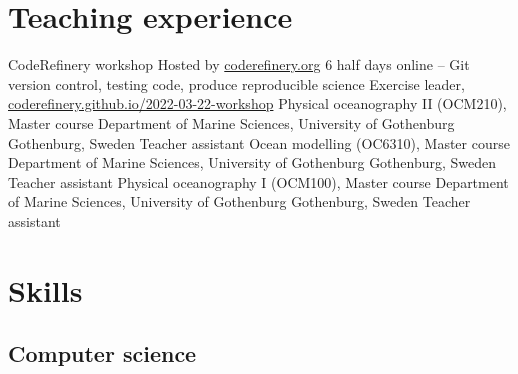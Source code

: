 \documentclass[11pt,a4paper,roman]{moderncv}
\begin{document}
\section{Teaching experience}
        {CodeRefinery workshop}
        {Hosted by \href{https://coderefinery.org}{coderefinery.org}}
        {6 half days online -- Git version control, testing code, produce reproducible science}
        {Exercise leader, \href{https://coderefinery.github.io/2022-03-22-workshop}{coderefinery.github.io/2022-03-22-workshop}}
        {}
        {Physical oceanography II (OCM210), Master course}
        {Department of Marine Sciences, University of Gothenburg}
        {Gothenburg, Sweden}
        {Teacher assistant}
        {}
        {Ocean modelling (OC6310), Master course}
        {Department of Marine Sciences, University of Gothenburg}
        {Gothenburg, Sweden}
        {Teacher assistant}
        {}
        {Physical oceanography I (OCM100), Master course}
        {Department of Marine Sciences, University of Gothenburg}
        {Gothenburg, Sweden}
        {Teacher assistant}
        {}


\nocite{*}



        
\section{Skills}


\subsection{Computer science}
\end{document}

